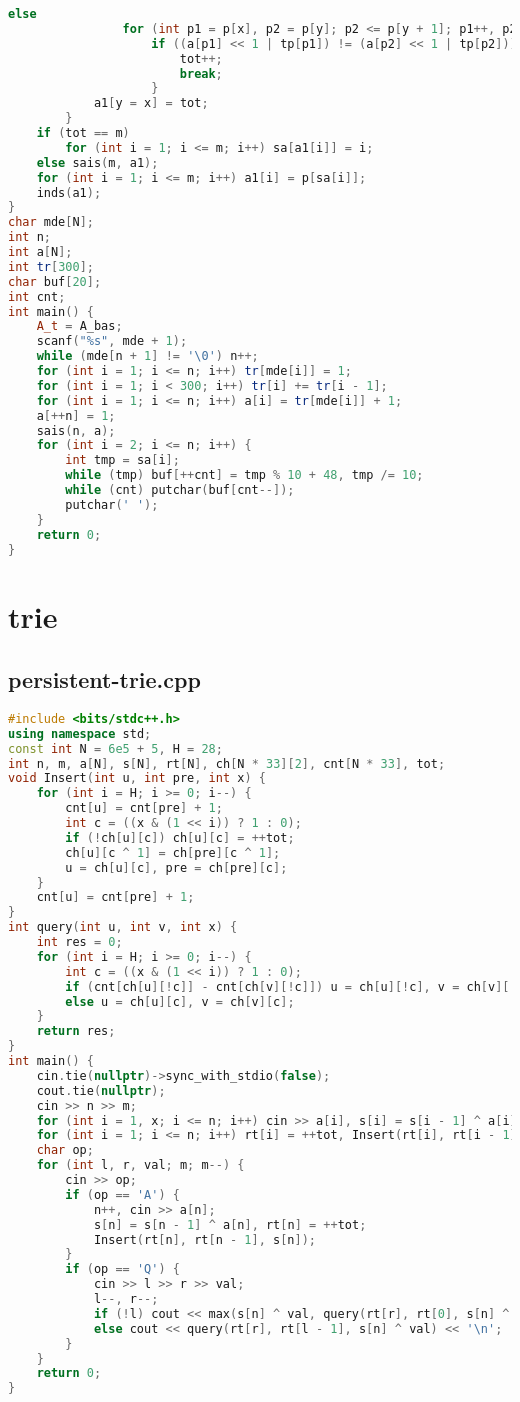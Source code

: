 \documentclass[9pt, a4paper, oneside]{book}
\begin{document}
\begin{lstlisting}[language={C++}]
            else
                for (int p1 = p[x], p2 = p[y]; p2 <= p[y + 1]; p1++, p2++)
                    if ((a[p1] << 1 | tp[p1]) != (a[p2] << 1 | tp[p2])) {
                        tot++;
                        break;
                    }
            a1[y = x] = tot;
        }
    if (tot == m)
        for (int i = 1; i <= m; i++) sa[a1[i]] = i;
    else sais(m, a1);
    for (int i = 1; i <= m; i++) a1[i] = p[sa[i]];
    inds(a1);
}
char mde[N];
int n;
int a[N];
int tr[300];
char buf[20];
int cnt;
int main() {
    A_t = A_bas;
    scanf("%s", mde + 1);
    while (mde[n + 1] != '\0') n++;
    for (int i = 1; i <= n; i++) tr[mde[i]] = 1;
    for (int i = 1; i < 300; i++) tr[i] += tr[i - 1];
    for (int i = 1; i <= n; i++) a[i] = tr[mde[i]] + 1;
    a[++n] = 1;
    sais(n, a);
    for (int i = 2; i <= n; i++) {
        int tmp = sa[i];
        while (tmp) buf[++cnt] = tmp % 10 + 48, tmp /= 10;
        while (cnt) putchar(buf[cnt--]);
        putchar(' ');
    }
    return 0;
}\end{lstlisting}
\section{trie}
\subsection{persistent-trie.cpp}
\begin{lstlisting}[language={C++}]
#include <bits/stdc++.h>
using namespace std;
const int N = 6e5 + 5, H = 28;
int n, m, a[N], s[N], rt[N], ch[N * 33][2], cnt[N * 33], tot;
void Insert(int u, int pre, int x) {
    for (int i = H; i >= 0; i--) {
        cnt[u] = cnt[pre] + 1;
        int c = ((x & (1 << i)) ? 1 : 0);
        if (!ch[u][c]) ch[u][c] = ++tot;
        ch[u][c ^ 1] = ch[pre][c ^ 1];
        u = ch[u][c], pre = ch[pre][c];
    }
    cnt[u] = cnt[pre] + 1;
}
int query(int u, int v, int x) {
    int res = 0;
    for (int i = H; i >= 0; i--) {
        int c = ((x & (1 << i)) ? 1 : 0);
        if (cnt[ch[u][!c]] - cnt[ch[v][!c]]) u = ch[u][!c], v = ch[v][!c], res += (1 << i);
        else u = ch[u][c], v = ch[v][c];
    }
    return res;
}
int main() {
    cin.tie(nullptr)->sync_with_stdio(false);
    cout.tie(nullptr);
    cin >> n >> m;
    for (int i = 1, x; i <= n; i++) cin >> a[i], s[i] = s[i - 1] ^ a[i];
    for (int i = 1; i <= n; i++) rt[i] = ++tot, Insert(rt[i], rt[i - 1], s[i]);
    char op;
    for (int l, r, val; m; m--) {
        cin >> op;
        if (op == 'A') {
            n++, cin >> a[n];
            s[n] = s[n - 1] ^ a[n], rt[n] = ++tot;
            Insert(rt[n], rt[n - 1], s[n]);
        }
        if (op == 'Q') {
            cin >> l >> r >> val;
            l--, r--;
            if (!l) cout << max(s[n] ^ val, query(rt[r], rt[0], s[n] ^ val)) << '\n';
            else cout << query(rt[r], rt[l - 1], s[n] ^ val) << '\n';
        }
    }
    return 0;
}\end{lstlisting}
\end{document}
